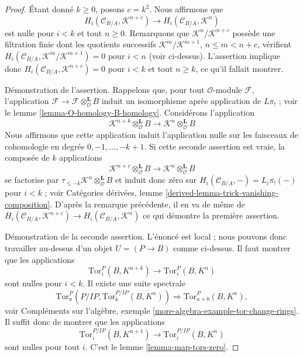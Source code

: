 \begin{proof}
\medskip\noindent
Étant donné $k \geq 0$, posons $c = k^2$. Nous affirmons que
$$
H_i(\mathcal{C}_{B/A}, \mathcal{K}^{n + c}) \to
H_i(\mathcal{C}_{B/A}, \mathcal{K}^n)
$$
est nulle pour $i < k$ et tout $n \geq 0$. Remarquons que
$\mathcal{K}^n/\mathcal{K}^{n + c}$ possède une filtration finie dont les
quotients successifs $\mathcal{K}^m/\mathcal{K}^{m + 1}$,
$n \leq m < n + c$, vérifient
$H_i(\mathcal{C}_{B/A}, \mathcal{K}^m/\mathcal{K}^{m + 1}) = 0$ pour $i < n$
(voir ci-dessus). L'assertion implique donc
$H_i(\mathcal{C}_{B/A}, \mathcal{K}^{n + c}) = 0$ pour $i < k$ et tout
$n \geq k$, ce qu'il fallait montrer.

\medskip\noindent
Démonstration de l'assertion. Rappelons que, pour tout $\mathcal{O}$-module
$\mathcal{F}$, l'application
$\mathcal{F} \to \mathcal{F} \otimes_\mathcal{O}^\mathbf{L} B$ induit un
isomorphisme après application de $L\pi_!$ ; voir le lemme
\ref{lemma-O-homology-B-homology}. Considérons l'application
$$
\mathcal{K}^{n + k} \otimes_\mathcal{O}^\mathbf{L} B
\longrightarrow
\mathcal{K}^n \otimes_\mathcal{O}^\mathbf{L} B
$$
Nous affirmons que cette application induit l'application nulle sur les
faisceaux de cohomologie en degrés $0, -1, \ldots, - k + 1$. Si cette seconde
assertion est vraie, la composée de $k$ applications
$$
\mathcal{K}^{n + c} \otimes_\mathcal{O}^\mathbf{L} B
\longrightarrow
\mathcal{K}^n \otimes_\mathcal{O}^\mathbf{L} B
$$
se factorise par
$\tau_{\leq -k}\mathcal{K}^n \otimes_\mathcal{O}^\mathbf{L} B$ et induit donc
zéro sur $H_i(\mathcal{C}_{B/A}, -) = L_i\pi_!( - )$ pour $i < k$ ; voir
Catégories dérivées, lemme
\ref{derived-lemma-trick-vanishing-composition}. D'après la remarque
précédente, il en va de même de
$H_i(\mathcal{C}_{B/A}, \mathcal{K}^{n + c}) \to
H_i(\mathcal{C}_{B/A}, \mathcal{K}^n)$
ce qui démontre la première assertion.

\medskip\noindent
Démonstration de la seconde assertion. L'énoncé est local ; nous pouvons donc
travailler au-dessus d'un objet $U = (P \to B)$ comme ci-dessus. Il faut
montrer que les applications
$$
\text{Tor}_i^P(B, K^{n + k}) \to \text{Tor}_i^P(B, K^n)
$$
sont nulles pour $i < k$. Il existe une suite spectrale
$$
\text{Tor}_a^P(P/IP, \text{Tor}_b^{P/IP}(B, K^n))
\Rightarrow
\text{Tor}_{a + b}^P(B, K^n),
$$
voir Compléments sur l'algèbre, exemple
\ref{more-algebra-example-tor-change-rings}. Il suffit donc de montrer que les
applications
$$
\text{Tor}_i^{P/IP}(B, K^{n + 1}) \to \text{Tor}_i^{P/IP}(B, K^n)
$$
sont nulles pour tout $i$. C'est le lemme \ref{lemma-map-tors-zero}.
\end{proof}


